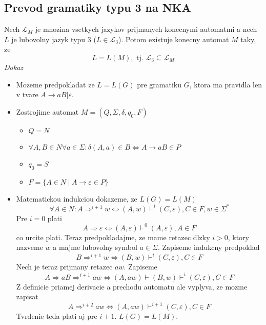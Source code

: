 \documentclass[12pt]{article}
\newcommand{\pipesep}{\hspace{3pt} \vert \hspace{3pt}}
\begin{document}
\subsection*{Prevod gramatiky typu 3 na NKA}
Nech $\mathcal{L}_{M}$ je mnozina vsetkych jazykov prijmanych konecnymi automatmi a nech $L$ je lubovolny
jazyk typu 3 ($L \in \mathcal{L}_{3}$). Potom existuje konecny automat $M$ taky, ze
\begin{equation*}
	L = L(M),\text{ tj. }\mathcal{L}_{3} \subseteq \mathcal{L}_{M}
\end{equation*}
\emph{Dokaz}
\begin{itemize}
	\item Mozeme predpokladat ze $L = L(G)$ pre gramatiku $G$, ktora ma pravidla len v tvare $A \to aB|\varepsilon$.
	\item Zostrojime automat $M = (Q,\Sigma,\delta,q_{0},F)$
		\begin{itemize}
			\item $Q = N$
			\item $\forall A,B \in N \forall a \in \Sigma: \delta(A,a) \in B \Leftrightarrow A \to aB \in P$
			\item $q_{0} = S$
			\item $F = \{ A \in N \pipesep A \to \varepsilon \in P\}$
		\end{itemize}
	\item Matematickou indukciou dokazeme, ze $L(G) = L(M)$
		\begin{equation*}
			\forall A \in N: A \Rightarrow^{i+1} w \Leftrightarrow (A, w) \vdash^{i} (C, \varepsilon), C \in F, w \in \Sigma^{*}
		\end{equation*}
	Pre $i = 0$ plati
		\begin{equation*}
			A \Rightarrow \varepsilon \Leftrightarrow (A, \varepsilon) \vdash^{0} (A, \varepsilon), A \in F
		\end{equation*}
	co urcite plati. Teraz predpokladajme, ze mame retazec dlzky $i > 0$, ktory nazveme $w$ a majme lubovolny symbol
	$a \in \Sigma$. Zapiseme indukcny predpoklad
		\begin{equation*}
			B \Rightarrow^{i+1} w \Leftrightarrow (B, w) \vdash^{i} (C, \varepsilon), C \in F
		\end{equation*}
	Nech je teraz prijmany retazec $aw$. Zapiseme
		\begin{equation*}
			A \Rightarrow aB \Rightarrow^{i+1} aw \Leftrightarrow (A,aw) \vdash (B, w) \vdash^{i} (C, \varepsilon), C \in F
		\end{equation*}
	Z definicie priamej derivacie a prechodu automatu ale vyplyva, ze mozme zapisat
		\begin{equation*}
			A \Rightarrow^{i+2} aw \Leftrightarrow (A,aw) \vdash^{i+1} (C, \varepsilon), C \in F
		\end{equation*}
	Tvrdenie teda plati aj pre $i + 1$. $L(G) = L(M)$.
\end{itemize}
\end{document}
